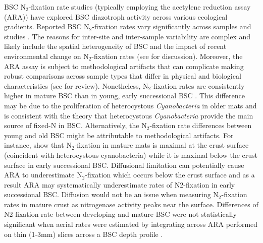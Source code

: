 BSC N$_{2}$-fixation rate studies (typically employing the acetylene reduction assay
(ARA)) have explored BSC diazotroph activity across various ecological
gradients. Reported BSC N$_{2}$-fixation rates vary significantly across samples
and studies \citep{Evans_2001}.  The reasons for inter-site and inter-sample
variability are complex and likely include the spatial heterogeneity of BSC
\citep{Evans_2001} and the impact of recent environmental change on
N$_{2}$-fixation rates (see \citet{Belnap_2001} for discussion).  Moreover, the ARA
assay is subject to methodological artifacts that can complicate making robust
comparisons across sample types that differ in physical and biological
characteristics (see \citet{Belnap_2001} for review). Nonetheless,
N$_{2}$-fixation rates are consistently higher in mature BSC than in young,
early successional BSC \citep{Belnap_2002, 14766579}. This difference may be
due to the proliferation of heterocystous \textit{Cyanobacteria} in older mats
and is consistent with the theory that heterocystous \textit{Cyanobacteria} 
provide the main source of fixed-N in BSC. Alternatively, the N$_{2}$-fixation rate
differences between young and old BSC might be attributable to methodological
artifacts.  For instance, \citet{15643930} show that N$_{2}$-fixation in mature
mats is maximal at the crust surface (coincident with heterocystous
cyanobacteria) while it is maximal below the crust surface in early
successional BSC.  Diffusional limitation can potentially cause ARA to
underestimate N$_{2}$-fixation which occurs below the crust surface and as a
result ARA may systematically underestimate rates of N2-fixation in early
successional BSC.  Diffusion would not be an issue when measuring
N$_{2}$-fixation rates in mature crust as nitrogenase activity peaks near the
surface.  Differences of N2 fixation rate between developing and mature BSC
were not statistically significant when aerial rates were estimated by
integrating across ARA performed on thin (1-3mm) slices across a BSC depth
profile \citet{15643930}.


